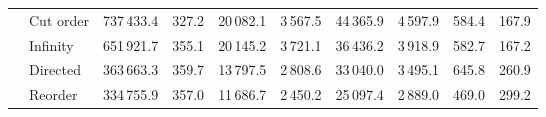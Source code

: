 \begin{tabular}{llrrrrrrrr}
       & Cut order &                 737\,433.4 &           327.2 &                                         20\,082.1 &                                           3\,567.5 &                                           44\,365.9 &                                             4\,597.9 &  584.4 &  167.9 \\
       & Infinity &                 651\,921.7 &           355.1 &                                         20\,145.2 &                                           3\,721.1 &                                           36\,436.2 &                                             3\,918.9 &  582.7 &  167.2 \\
       & Directed &                 363\,663.3 &           359.7 &                                         13\,797.5 &                                           2\,808.6 &                                           33\,040.0 &                                             3\,495.1 &  645.8 &  260.9 \\
       & Reorder &                 334\,755.9 &           357.0 &                                         11\,686.7 &                                           2\,450.2 &                                           25\,097.4 &                                             2\,889.0 &  469.0 &  299.2 \\
\bottomrule
\end{tabular}

